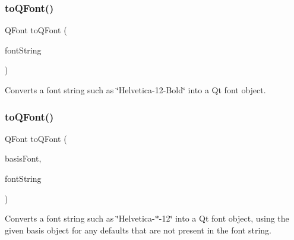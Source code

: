 \subsubsection{\texorpdfstring{to\+Q\+Font()}{toQFont()}\hspace{0.1cm}{\footnotesize\ttfamily [1/2]}}
{\footnotesize\ttfamily Q\+Font to\+Q\+Font (\begin{DoxyParamCaption}\item[{const std\+::string \&}]{font\+String }\end{DoxyParamCaption})\hspace{0.3cm}{\ttfamily [static]}}



Converts a font string such as \char`\"{}\+Helvetica-\/12-\/\+Bold\char`\"{} into a Qt font object. 

\mbox{\label{classsgl_1_1GFont_a7eea6ca714d168dc53c86124bb4fc387}} 
\subsubsection{\texorpdfstring{to\+Q\+Font()}{toQFont()}\hspace{0.1cm}{\footnotesize\ttfamily [2/2]}}
{\footnotesize\ttfamily Q\+Font to\+Q\+Font (\begin{DoxyParamCaption}\item[{const Q\+Font \&}]{basis\+Font,  }\item[{const std\+::string \&}]{font\+String }\end{DoxyParamCaption})\hspace{0.3cm}{\ttfamily [static]}}



Converts a font string such as \char`\"{}\+Helvetica-\/$\ast$-\/12\char`\"{} into a Qt font object, using the given \textquotesingle{}basis\textquotesingle{} object for any defaults that are not present in the font string. 

